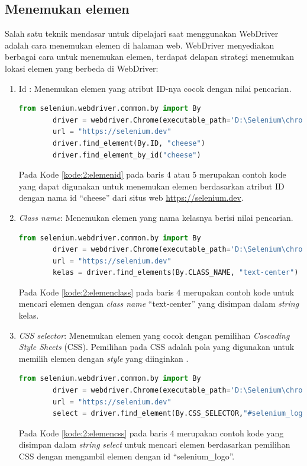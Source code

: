 \subsection{Menemukan elemen}
Salah satu teknik mendasar untuk dipelajari saat menggunakan WebDriver adalah cara menemukan elemen di halaman web. WebDriver menyediakan berbagai cara untuk menemukan elemen, terdapat delapan strategi menemukan lokasi elemen yang berbeda di WebDriver:
\begin{enumerate}
	\item Id : Menemukan elemen yang atribut ID-nya cocok dengan nilai pencarian.
	\begin{lstlisting}[language=python, caption=Contoh kode untuk menemukan elemen dengan atribut ID, label=kode:2:elemenid]
		from selenium.webdriver.common.by import By
		driver = webdriver.Chrome(executable_path='D:\Selenium\chromedriver.exe')
		url = "https://selenium.dev"
		driver.find_element(By.ID, "cheese")	
		driver.find_element_by_id("cheese")
	\end{lstlisting}
	Pada Kode \ref{kode:2:elemenid} pada baris 4 atau 5 merupakan contoh kode yang dapat digunakan untuk menemukan elemen berdasarkan atribut ID dengan nama id ``cheese'' dari situs web \url{https://selenium.dev}. 

	\item \textit{Class name}: Menemukan elemen yang nama kelasnya berisi nilai pencarian.
	\begin{lstlisting}[language=python, caption=Contoh kode untuk menemukan elemen dengan \textit{class name}, label=kode:2:elemenclass]
		from selenium.webdriver.common.by import By
		driver = webdriver.Chrome(executable_path='D:\Selenium\chromedriver.exe')
		url = "https://selenium.dev"
		kelas = driver.find_elements(By.CLASS_NAME, "text-center")
	\end{lstlisting}
	Pada Kode \ref{kode:2:elemenclass} pada baris 4 merupakan contoh kode untuk mencari elemen dengan \textit{class name} ``text-center'' yang disimpan dalam \textit{string} kelas.
	
	\item \textit{CSS selector}: Menemukan elemen yang cocok dengan pemilihan \textit{Cascading Style Sheets} (CSS). Pemilihan pada CSS adalah pola yang digunakan untuk memilih elemen dengan \textit{style} yang diinginkan .
	\begin{lstlisting}[language=python, caption=Contoh kode untuk menemukan elemen dengan \textit{CSS selector}, label=kode:2:elemencss]
		from selenium.webdriver.common.by import By
		driver = webdriver.Chrome(executable_path='D:\Selenium\chromedriver.exe')
		url = "https://selenium.dev"
		select = driver.find_element(By.CSS_SELECTOR,"#selenium_logo")
	\end{lstlisting}
	Pada Kode \ref{kode:2:elemencss} pada baris 4 merupakan contoh kode yang disimpan dalam \textit{string} \textit{select} untuk mencari elemen berdasarkan pemilihan CSS dengan mengambil elemen dengan id ``selenium\_logo''.
	

\end{enumerate}

